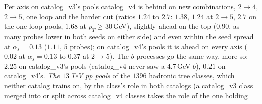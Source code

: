 \documentclass[11pt]{article}
\begin{document}
Per axis on catalog\_v3's pools catalog\_v4 is behind on new combinations, $2\to4$, $2\to5$, one loop and the harder cut
(ratios $1.24$ to $2.7$: $1.38$, $1.24$ at $2\to5$, $2.7$ on the one-loop pools, $1.68$ at $p_T\geq30$\,GeV), slightly
ahead on the top ($0.90$, as many probes lower in both seeds on either side) and even within the seed spread at
$\alpha_s=0.13$ ($1.11$, $5$ probes); on catalog\_v4's pools it is ahead on every axis ($0.02$ at $\alpha_s=0.13$ to $0.37$ at $2\to5$). The $b$
processes go the same way, more so: $2.25$ on catalog\_v3's pools (catalog\_v4 never saw a $4.7$\,GeV $b$), $0.21$ on
catalog\_v4's.
\emph{The $13$\,TeV pp pools} of the $1396$ hadronic tree classes, which neither catalog trains on, by the class's role
in both catalogs (a catalog\_v3 class merged into or split across catalog\_v4 classes takes the role of the one holding
\end{document}
